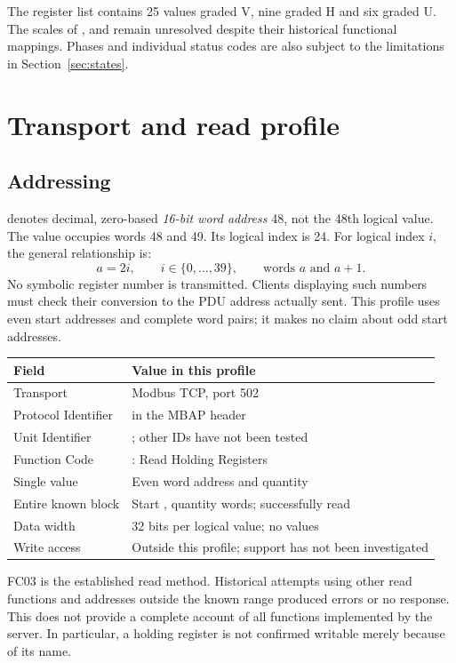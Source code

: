 \documentclass[10pt,a4paper]{article}
\begin{document}
The register list contains 25 values graded V, nine graded H and six graded U. The scales of ,  and  remain unresolved despite their historical functional mappings. Phases and individual status codes are also subject to the limitations in Section~\ref{sec:states}.

\section{Transport and read profile}
\label{sec:transport}
\subsection{Addressing}
 denotes decimal, zero-based \emph{16-bit word address} 48, not the 48th logical value. The value occupies words 48 and 49. Its logical index is 24. For logical index $i$, the general relationship is:
\[
 a=2i,\qquad i\in\{0,\ldots,39\},\qquad \text{words }a\text{ and }a+1.
\]
No symbolic  register number is transmitted. Clients displaying such numbers must check their conversion to the PDU address actually sent. This profile uses even start addresses and complete word pairs; it makes no claim about odd start addresses.

\par\noindent\begin{tabularx}{\linewidth}{@{}L{46mm}X@{}}
\toprule
\textbf{Field} & \textbf{Value in this profile}\\\midrule
Transport & Modbus TCP, port 502\\
Protocol Identifier &  in the MBAP header\\
Unit Identifier & ; other IDs have not been tested\\
Function Code & : Read Holding Registers\\
Single value & Even word address and quantity \\
Entire known block & Start , quantity  words; successfully read\\
Data width & 32 bits per logical value; no  values\\
Write access & Outside this profile; support has not been investigated\\\bottomrule
\end{tabularx}\par

FC03 is the established read method. Historical attempts using other read functions and addresses outside the known range produced errors or no response. This does not provide a complete account of all functions implemented by the server. In particular, a holding register is not confirmed writable merely because of its name.
\end{document}
